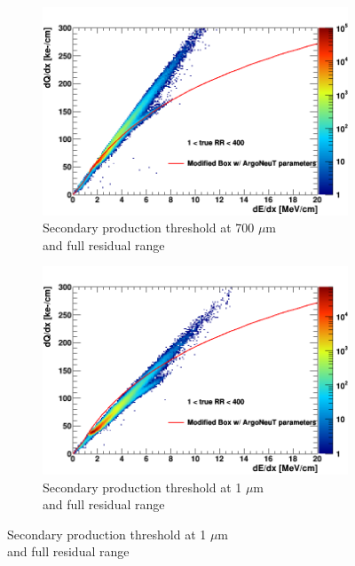 \begin{figure}[hb!]
        \centering
        \begin{subfigure}[b]{0.495\textwidth}
            \centering
            \includegraphics[width=\textwidth]{mu_700um}
            \caption{Secondary production threshold at 700 $\mu$m \\and full residual range}%
            \label{fig:mu_2d_700}
        \end{subfigure}
        \hfill
        \begin{subfigure}[b]{0.495\textwidth}  
            \centering 
            \includegraphics[width=\textwidth]{mu_1um}
            \caption{Secondary production threshold at 1 $\mu$m \\and full residual range}%
            \label{fig:mu_2d_1}
        \end{subfigure}

\end{figure}
